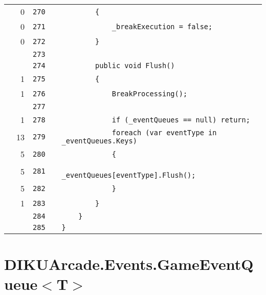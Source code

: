 \documentclass[a4paper,landscape,10pt]{article}
\begin{document}
\begin{longtable}[l]{lrrll}
\cellcolor{red} & 0 & \verb~270~ & & \verb~        {~\\
\cellcolor{red} & 0 & \verb~271~ & & \verb~            _breakExecution = false;~\\
\cellcolor{red} & 0 & \verb~272~ & & \verb~        }~\\
\cellcolor{gray} &  & \verb~273~ & & \verb~~\\
\cellcolor{gray} &  & \verb~274~ & & \verb~        public void Flush()~\\
\cellcolor{green} & 1 & \verb~275~ & & \verb~        {~\\
\cellcolor{green} & 1 & \verb~276~ & & \verb~            BreakProcessing();~\\
\cellcolor{gray} &  & \verb~277~ & & \verb~~\\
\cellcolor{green} & 1 & \verb~278~ & & \verb~            if (_eventQueues == null) return;~\\
\cellcolor{green} & 13 & \verb~279~ & & \verb~            foreach (var eventType in _eventQueues.Keys)~\\
\cellcolor{green} & 5 & \verb~280~ & & \verb~            {~\\
\cellcolor{green} & 5 & \verb~281~ & & \verb~                _eventQueues[eventType].Flush();~\\
\cellcolor{green} & 5 & \verb~282~ & & \verb~            }~\\
\cellcolor{green} & 1 & \verb~283~ & & \verb~        }~\\
\cellcolor{gray} &  & \verb~284~ & & \verb~    }~\\
\cellcolor{gray} &  & \verb~285~ & & \verb~}~\\
\end{longtable}
\newpage
\section{DIKUArcade.Events.GameEventQueue$<$T$>$}
\end{document}
